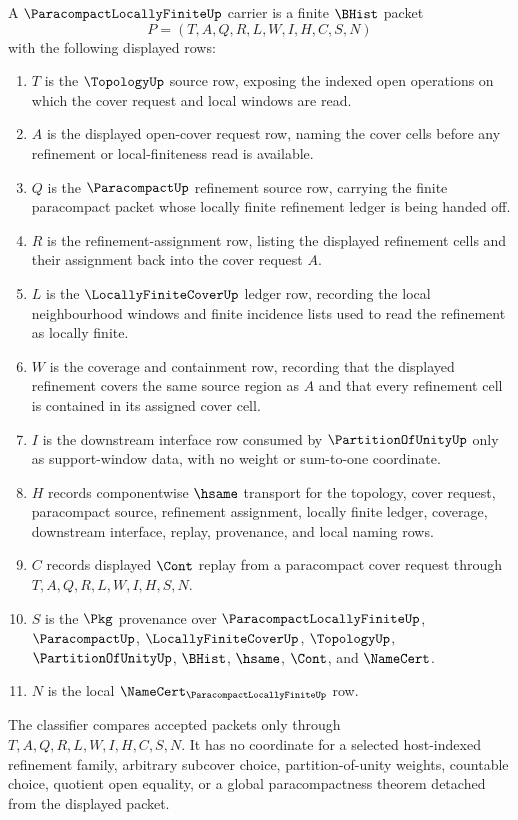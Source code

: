 \begin{definition}
\label{def:paracompact-locally-finite-carrier}
A $\ParacompactLocallyFiniteUp$ carrier is a finite $\BHist$ packet
$$
P=(T,A,Q,R,L,W,I,H,C,S,N)
$$
with the following displayed rows:
\begin{enumerate}
\item $T$ is the $\TopologyUp$ source row, exposing the indexed open operations on which the cover request and local windows are read.
\item $A$ is the displayed open-cover request row, naming the cover cells before any refinement or local-finiteness read is available.
\item $Q$ is the $\ParacompactUp$ refinement source row, carrying the finite paracompact packet whose locally finite refinement ledger is being handed off.
\item $R$ is the refinement-assignment row, listing the displayed refinement cells and their assignment back into the cover request $A$.
\item $L$ is the $\LocallyFiniteCoverUp$ ledger row, recording the local neighbourhood windows and finite incidence lists used to read the refinement as locally finite.
\item $W$ is the coverage and containment row, recording that the displayed refinement covers the same source region as $A$ and that every refinement cell is contained in its assigned cover cell.
\item $I$ is the downstream interface row consumed by $\PartitionOfUnityUp$ only as support-window data, with no weight or sum-to-one coordinate.
\item $H$ records componentwise $\hsame$ transport for the topology, cover request, paracompact source, refinement assignment, locally finite ledger, coverage, downstream interface, replay, provenance, and local naming rows.
\item $C$ records displayed $\Cont$ replay from a paracompact cover request through $T,A,Q,R,L,W,I,H,S,N$.
\item $S$ is the $\Pkg$ provenance over $\ParacompactLocallyFiniteUp$, $\ParacompactUp$, $\LocallyFiniteCoverUp$, $\TopologyUp$, $\PartitionOfUnityUp$, $\BHist$, $\hsame$, $\Cont$, and $\NameCert$.
\item $N$ is the local $\NameCert_{\ParacompactLocallyFiniteUp}$ row.
\end{enumerate}
The classifier compares accepted packets only through $T,A,Q,R,L,W,I,H,C,S,N$. It has no coordinate for a selected host-indexed refinement family, arbitrary subcover choice, partition-of-unity weights, countable choice, quotient open equality, or a global paracompactness theorem detached from the displayed packet.
\end{definition}

